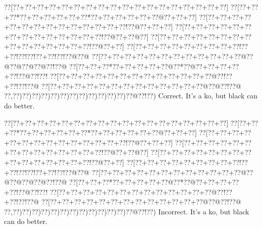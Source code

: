 \documentclass[a5paper]{article}
\begin{document}
\begin{center}
{\goo
\0??[\0??+\0??+\0??+\0??+\0??+\0??+\0??+\0??+\0??+\0??+\0??+\0??+\0??+\0??+\0??+\0??+\0??+\0??]
\0??[\0??+\0??+\0??*\0??+\0??+\0??+\0??+\0??+\0??*\0??+\0??+\0??+\0??+\0??+\0??@\0??+\0??+\0??]
\0??[\0??+\0??+\0??+\0??+\0??+\0??+\0??+\0??+\0??+\0??+\0??+\0??+\0??+\0??!\0??@\0??+\0??+\0??]
\0??[\0??+\0??+\0??+\0??+\0??+\0??+\0??+\0??+\0??+\0??+\0??+\0??+\0??+\0??!\0??@\0??+\0??@\0??]
\0??[\0??+\0??+\0??+\0??+\0??+\0??+\0??+\0??+\0??+\0??+\0??+\0??+\0??+\0??+\0??!\0??@\0??+\0??]
\0??[\0??+\0??+\0??+\0??+\0??+\0??+\0??+\0??+\0??!\0??+\0??!\0??!\0??!\0??+\0??!\0??!\0??@\0??@
\0??[\0??+\0??+\0??+\0??+\0??+\0??+\0??+\0??+\0??+\0??+\0??+\0??@\0??@\0??@\0??@\0??@\0??!\0??@
\0??[\0??+\0??+\0??*\0??+\0??+\0??+\0??+\0??@\0??*\0??@\0??+\0??+\0??+\0??+\0??!\0??@\0??!\0??!
\0??[\0??+\0??+\0??+\0??+\0??+\0??+\0??+\0??+\0??+\0??+\0??+\0??+\0??@\0??!\0??+\0??!\0??!\0??@
\0??[\0??+\0??+\0??+\0??+\0??+\0??+\0??+\0??+\0??+\0??+\0??+\0??+\0??@\0??@\0??!\0??@
\0??,\0??)\0??)\0??)\0??)\0??)\0??)\0??)\0??)\0??)\0??)\0??)\0??)\0??@\0??!\0??)
}
Correct. It's a ko, but black can do better.

\end{center}
\begin{center}
{\goo
\0??[\0??+\0??+\0??+\0??+\0??+\0??+\0??+\0??+\0??+\0??+\0??+\0??+\0??+\0??+\0??+\0??+\0??+\0??]
\0??[\0??+\0??+\0??*\0??+\0??+\0??+\0??+\0??+\0??*\0??+\0??+\0??+\0??+\0??+\0??@\0??+\0??+\0??]
\0??[\0??+\0??+\0??+\0??+\0??+\0??+\0??+\0??+\0??+\0??+\0??+\0??+\0??+\0??!\0??@\0??+\0??+\0??]
\0??[\0??+\0??+\0??+\0??+\0??+\0??+\0??+\0??+\0??+\0??+\0??+\0??+\0??+\0??!\0??@\0??+\0??@\0??]
\0??[\0??+\0??+\0??+\0??+\0??+\0??+\0??+\0??+\0??+\0??+\0??+\0??+\0??+\0??+\0??!\0??@\0??+\0??]
\0??[\0??+\0??+\0??+\0??+\0??+\0??+\0??+\0??+\0??!\0??+\0??!\0??!\0??!\0??+\0??!\0??!\0??@\0??@
\0??[\0??+\0??+\0??+\0??+\0??+\0??+\0??+\0??+\0??+\0??+\0??+\0??@\0??@\0??@\0??@\0??@\0??!\0??@
\0??[\0??+\0??+\0??*\0??+\0??+\0??+\0??+\0??@\0??*\0??@\0??+\0??+\0??+\0??+\0??!\0??@\0??!\0??!
\0??[\0??+\0??+\0??+\0??+\0??+\0??+\0??+\0??+\0??+\0??+\0??+\0??+\0??@\0??!\0??+\0??!\0??!\0??@
\0??[\0??+\0??+\0??+\0??+\0??+\0??+\0??+\0??+\0??+\0??+\0??+\0??+\0??@\0??@\0??!\0??@
\0??,\0??)\0??)\0??)\0??)\0??)\0??)\0??)\0??)\0??)\0??)\0??)\0??)\0??@\0??!\0??)
}
Incorrect. It's a ko, but black can do better.

\end{center}
\newpage
\end{document}
